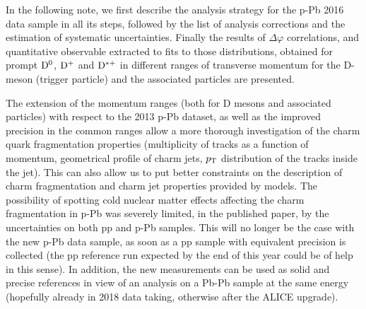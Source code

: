 In the following note, we first describe the analysis strategy for the p-Pb 2016 data sample in all its steps, followed by the list of analysis corrections and the estimation of systematic uncertainties. Finally the results of $\Delta\varphi$ correlations, and quantitative observable extracted to fits to those distributions, obtained for prompt $\rm{D^0}$, $\rm{D^{+}}$ and $\rm{D^{*+}}$ in different ranges of transverse momentum for the D-meson (trigger particle) and the associated particles are presented.

The extension of the momentum ranges (both for D mesons and associated particles) with respect to the 2013 p-Pb dataset, as well as the improved precision in the common ranges allow a more thorough investigation of the charm quark fragmentation properties (multiplicity of tracks as a function of momentum, geometrical profile of charm jets, $p_{\rm T}$ distribution of the tracks inside the jet). This can also allow us to put better constraints on the description of charm fragmentation and charm jet properties provided by models.
The possibility of spotting cold nuclear matter effects affecting the charm fragmentation in p-Pb was severely limited, in the published paper, by the uncertainties on both pp and p-Pb samples. This will no longer be the case with the new p-Pb data sample, as soon as a pp sample with equivalent precision is collected (the pp reference run expected by the end of this year could be of help in this sense).
In addition, the new measurements can be used as solid and precise references in view of an analysis on a Pb-Pb sample at the same energy (hopefully already in 2018 data taking, otherwise after the ALICE upgrade).
